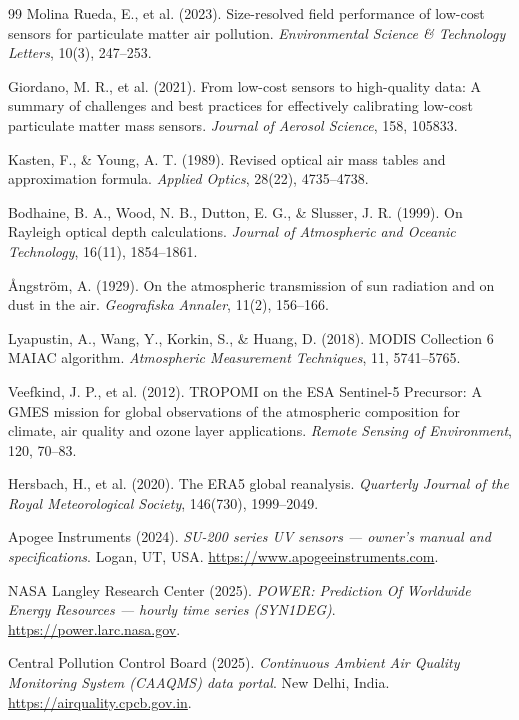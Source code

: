 \documentclass[11pt,a4paper]{article}
\begin{document}
\begin{thebibliography}{99}
 Molina Rueda, E., et al. (2023). Size-resolved field performance of
low-cost sensors for particulate matter air pollution. \emph{Environmental Science \&
Technology Letters}, 10(3), 247--253.

 Giordano, M. R., et al. (2021). From low-cost sensors to
high-quality data: A summary of challenges and best practices for effectively calibrating
low-cost particulate matter mass sensors. \emph{Journal of Aerosol Science}, 158, 105833.

 Kasten, F., \& Young, A. T. (1989). Revised optical air mass tables
and approximation formula. \emph{Applied Optics}, 28(22), 4735--4738.

 Bodhaine, B. A., Wood, N. B., Dutton, E. G., \& Slusser, J. R.
(1999). On Rayleigh optical depth calculations. \emph{Journal of Atmospheric and Oceanic
Technology}, 16(11), 1854--1861.

 \r{A}ngstr\"om, A. (1929). On the atmospheric transmission of sun
radiation and on dust in the air. \emph{Geografiska Annaler}, 11(2), 156--166.

 Lyapustin, A., Wang, Y., Korkin, S., \& Huang, D. (2018). MODIS
Collection 6 MAIAC algorithm. \emph{Atmospheric Measurement Techniques}, 11, 5741--5765.

 Veefkind, J. P., et al. (2012). TROPOMI on the ESA Sentinel-5
Precursor: A GMES mission for global observations of the atmospheric composition for
climate, air quality and ozone layer applications. \emph{Remote Sensing of Environment},
120, 70--83.

 Hersbach, H., et al. (2020). The ERA5 global reanalysis.
\emph{Quarterly Journal of the Royal Meteorological Society}, 146(730), 1999--2049.

 Apogee Instruments (2024). \emph{SU-200 series UV sensors --- owner's
manual and specifications}. Logan, UT, USA. \url{https://www.apogeeinstruments.com}.

 NASA Langley Research Center (2025). \emph{POWER: Prediction Of Worldwide
Energy Resources --- hourly time series (SYN1DEG)}. \url{https://power.larc.nasa.gov}.

 Central Pollution Control Board (2025). \emph{Continuous Ambient Air
Quality Monitoring System (CAAQMS) data portal}. New Delhi, India.
\url{https://airquality.cpcb.gov.in}.

\end{thebibliography}
\end{document}
